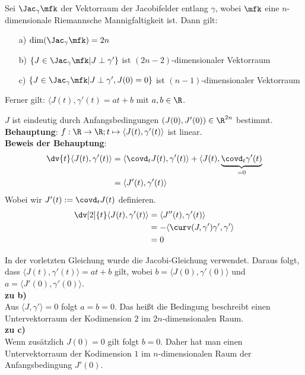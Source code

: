 \begin{lem}

Sei $\Jac_\gamma \mfk$ der Vektorraum der Jacobifelder entlang $\gamma$, wobei 
$\mfk$ eine $n$-dimensionale Riemannsche Mannigfaltigkeit ist.
Dann gilt:
\begin{itemize}
\item[a)] $\dim (\Jac_\gamma \mfk) = 2n$
\item[b)] $\{ J \in \Jac_\gamma \mfk \vert J \perp \gamma' \}$ ist 
    $(2n-2)$-dimensionaler Vektorraum
\item[c)] $\{ J \in \Jac_\gamma \mfk \vert J \perp \gamma' , J(0)=0\}$ ist 
    $(n-1)$-dimensionaler Vektorraum
\end{itemize}
Ferner gilt: $\langle J(t) , \gamma'(t) = at + b$ mit $a,b \in \R$.
\end{lem}
\begin{bew}
$J$ ist eindeutig durch Anfangsbedingungen $(J(0),J'(0))\in\R^{2n}$ bestimmt.\\
\textbf{Behauptung}: $f: \R\to\R; t \mapsto \langle J(t) , \gamma'(t)\rangle$
ist linear.\\
\textbf{Beweis der Behauptung}:
\begin{align*}
\dv{t}\langle J(t), \gamma'(t)\rangle &= \langle \covd_t J(t), \gamma'(t) \rangle 
+ \langle J(t),\underbrace{\covd_t \gamma'(t)}_{=0}\\
&=  \langle J'(t) , \gamma'(t)\rangle
\end{align*}
Wobei wir $J'(t):=\covd_t J(t)$ definieren.
\begin{align*}
\dv[2]{t} \langle J(t), \gamma'(t)\rangle &= \langle J''(t), \gamma'(t)\rangle \\
&= -\langle\curv(J, \gamma')\gamma', \gamma'\rangle\\
&= 0
\end{align*}

In der vorletzten Gleichung wurde die Jacobi-Gleichung verwendet.
Daraus folgt, dass $\langle J(t), \gamma'(t) \rangle = at + b$ gilt,
wobei $b=\langle J(0), \gamma'(0) \rangle$ und $a = \langle J'(0), \gamma'(0)\rangle$.\\
\textbf{zu b)}\\
Aus $\langle J, \gamma' \rangle = 0 $ folgt $a = b = 0$.
Das heißt die Bedingung beschreibt einen Untervektorraum der Kodimension $2$ im $2n$-dimensionalen
Raum.\\
\textbf{zu c)}\\
Wenn zusätzlich $J(0)=0$ gilt folgt $b = 0$.
Daher hat man einen Untervektorraum der Kodimension $1$ im $n$-dimensionalen Raum
der Anfangsbedingung $J'(0)$.
\end{bew}


